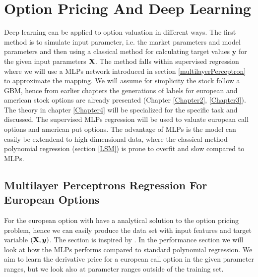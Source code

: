 
\chapter{Option Pricing And Deep Learning} %

\label{Chapter5} %

Deep learning can be applied to option valuation in different ways. The first method is to simulate input parameter, i.e. the market parameters and model parameters and then using a classical method for calculating target values $\bm{y}$ for the given input parameters $\mathbf{X}$. The method falls within supervised regression where we will use a MLPs network introduced in section \ref{multilayerPerceptron} to approximate the mapping. We will assume for simplicity the stock follow a GBM, hence from earlier chapters the generations of labels for european and american stock options are already presented (Chapter \ref{Chapter2}, \ref{Chapter3}). The theory in chapter \ref{Chapter4} will be specialized for the specific task and discussed. The supervised MLPs regression will be used to valuate european call options and american put options. The advantage of MLPs is the model can easily be extendend to high dimensional data, where the classical method polynomial regression (section \ref{LSM}) is prone to overfit and slow compared to MLPs. 


\section{Multilayer Perceptrons Regression For European Options}
For the european option with have a analytical solution to the option pricing problem, hence we can easily produce the data set with input features and target variable $(\mathbf{X},\bm{y})$. The section is inspired by \parencite{HirsaAli2019}. In the performance section we will look at how the MLPs performs compared to standard polynomial regression. We aim to learn the derivative price for a european call option in the given parameter ranges, but we look also at parameter ranges outside of the training set.

